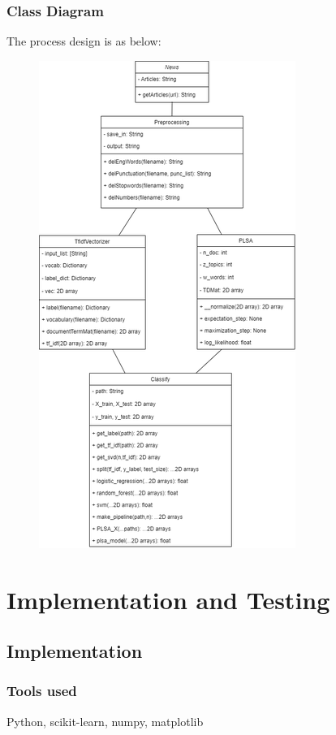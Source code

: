 \documentclass[12pt]{report}
\begin{document}
        \subsection{Class Diagram}
        The process design is as below:
        \begin{figure}[h]
            \centering
            \includegraphics[scale=0.85]{class_diagram.png}
        \end{figure}

        \chapter{Implementation and Testing}

        \section{Implementation}
        \subsection{Tools used} Python, scikit-learn, numpy, matplotlib
\end{document}
